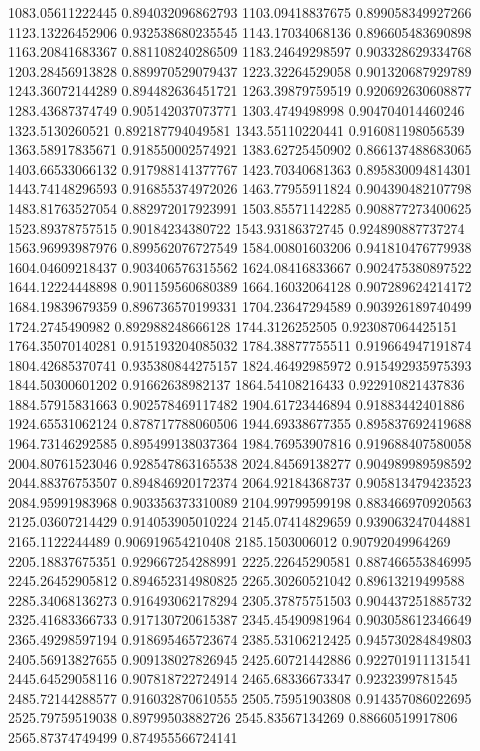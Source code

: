 {1083.05611222445 0.894032096862793
1103.09418837675 0.899058349927266
1123.13226452906 0.932538680235545
1143.17034068136 0.896605483690898
1163.20841683367 0.881108240286509
1183.24649298597 0.903328629334768
1203.28456913828 0.889970529079437
1223.32264529058 0.901320687929789
1243.36072144289 0.894482636451721
1263.39879759519 0.920692630608877
1283.43687374749 0.905142037073771
1303.4749498998 0.904704014460246
1323.5130260521 0.892187794049581
1343.55110220441 0.916081198056539
1363.58917835671 0.918550002574921
1383.62725450902 0.866137488683065
1403.66533066132 0.917988141377767
1423.70340681363 0.895830094814301
1443.74148296593 0.916855374972026
1463.77955911824 0.904390482107798
1483.81763527054 0.882972017923991
1503.85571142285 0.908877273400625
1523.89378757515 0.90184234380722
1543.93186372745 0.924890887737274
1563.96993987976 0.899562076727549
1584.00801603206 0.941810476779938
1604.04609218437 0.903406576315562
1624.08416833667 0.902475380897522
1644.12224448898 0.901159560680389
1664.16032064128 0.907289624214172
1684.19839679359 0.896736570199331
1704.23647294589 0.903926189740499
1724.2745490982 0.892988248666128
1744.3126252505 0.923087064425151
1764.35070140281 0.915193204085032
1784.38877755511 0.919664947191874
1804.42685370741 0.935380844275157
1824.46492985972 0.915492935975393
1844.50300601202 0.91662638982137
1864.54108216433 0.922910821437836
1884.57915831663 0.902578469117482
1904.61723446894 0.91883442401886
1924.65531062124 0.878717788060506
1944.69338677355 0.895837692419688
1964.73146292585 0.895499138037364
1984.76953907816 0.919688407580058
2004.80761523046 0.928547863165538
2024.84569138277 0.904989989598592
2044.88376753507 0.894846920172374
2064.92184368737 0.905813479423523
2084.95991983968 0.903356373310089
2104.99799599198 0.883466970920563
2125.03607214429 0.914053905010224
2145.07414829659 0.939063247044881
2165.1122244489 0.906919654210408
2185.1503006012 0.90792049964269
2205.18837675351 0.929667254288991
2225.22645290581 0.887466553846995
2245.26452905812 0.894652314980825
2265.30260521042 0.89613219499588
2285.34068136273 0.916493062178294
2305.37875751503 0.904437251885732
2325.41683366733 0.917130720615387
2345.45490981964 0.903058612346649
2365.49298597194 0.918695465723674
2385.53106212425 0.945730284849803
2405.56913827655 0.909138027826945
2425.60721442886 0.922701911131541
2445.64529058116 0.907818722724914
2465.68336673347 0.9232399781545
2485.72144288577 0.916032870610555
2505.75951903808 0.914357086022695
2525.79759519038 0.89799503882726
2545.83567134269 0.88660519917806
2565.87374749499 0.874955566724141
}
